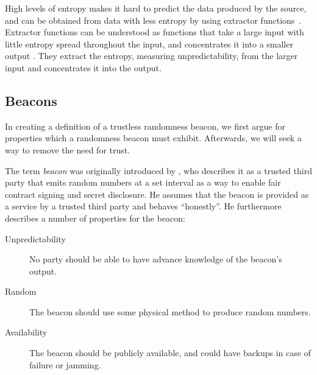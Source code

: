 High levels of entropy makes it hard to predict the data produced by the source, and can be obtained from data with less entropy by using extractor functions~\cite{pseudorandomness}.
Extractor functions can be understood as functions that take a large input with little entropy spread throughout the input, and concentrates it into a smaller output .
They extract the entropy, measuring unpredictability, from the larger input and concentrates it into the output. 


\subsection{Beacons}

In creating a definition of a trustless randomness  beacon, we first argue for properties which a randomness beacon must exhibit.
Afterwards, we will seek a way to remove the need for trust.

The term \emph{beacon} was originally introduced by \citet{rabin1983transaction}, who describes it as a trusted third party that emits random numbers at a set interval as a way to enable fair contract signing and secret disclosure.
He assumes that the beacon is provided as a service by a trusted third party and behaves \enquote{honestly}.
He furthermore describes a number of properties for the beacon:

\begin{description}
    \item[Unpredictability] No party should be able to have advance knowledge of the beacon's output. 
    \item[Random] The beacon should use some physical method to produce random numbers. 
    \item[Availability] The beacon should be publicly available, and could have backups in case of failure or jamming.
\end{description}

